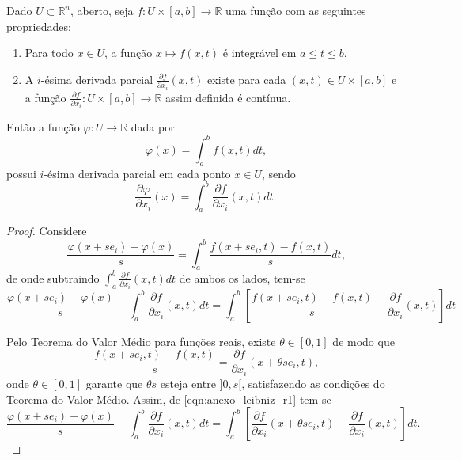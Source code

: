 \begin{apendicesenv}
{	\begin{teorema}
		\label{teorema:regra_de_leibniz}
		Dado $U\subset \mathbb{R}^n$, aberto, seja $f:U\times[a,b]\longrightarrow \mathbb{R}$ uma função com as seguintes propriedades:
		\begin{enumerate}
			\item Para todo $x \in U$, a função $x \longmapsto f(x,t)$ é integrável em $a \leqslant t \leqslant b$.
			\item A $i$-ésima derivada parcial $\frac{\partial f}{\partial x_i}(x,t)$ existe para cada $(x,t)\in U\times [a,b]$ e a função $\frac{\partial f}{\partial x_i}:U\times [a,b]\longrightarrow \mathbb{R}$ assim definida é contínua.
		\end{enumerate}
		Então a função $\varphi: U\longrightarrow \mathbb{R}$ dada por
		$$\varphi(x)=\int_a^b f(x,t)dt\text{,}$$
		possui $i$-ésima derivada parcial em cada ponto $x\in U$, sendo
		$$\frac{\partial \varphi}{\partial x_i}(x)=\int_a^b \frac{\partial f}{\partial x_i}(x,t)dt\text{.}$$

		\begin{proof}
			Considere
			$$
			\frac{\varphi(x+se_i)-\varphi(x)}{s}
			=
			\int_a^b \frac{f(x+se_i, t)-f(x,t)}{s} dt\text{,}
			$$
			de onde subtraindo $\int_a^b \frac{\partial f}{\partial x_i}(x,t) dt$ de ambos os lados, tem-se
			\begin{equation}
			\label{eqn:anexo_leibniz_r1}
			\frac{\varphi(x+se_i)-\varphi(x)}{s}
			- \int_a^b \frac{\partial f}{\partial x_i}(x,t) dt
			=
			\int_a^b \left [ 
				\frac{f(x+se_i, t)-f(x,t)}{s} 
				- \frac{\partial f}{\partial x_i}(x,t)
			\right ] dt
			\end{equation}
			
			Pelo Teorema do Valor Médio para funções reais, existe $\theta \in [0,1]$ de modo que
			$$
				\frac{f(x+se_i,t)-f(x,t)}{s}=\frac{\partial f}{\partial x_i}(x+\theta s e_i,t)\text{,}
			$$
			onde $\theta \in [0,1]$ garante que $\theta s$ esteja entre $]0, s[$, satisfazendo as condições do Teorema do Valor Médio. Assim, de \eqref{eqn:anexo_leibniz_r1} tem-se
			\begin{equation}
				\label{eqn:anexo_leibniz_voltas}
				\frac{\varphi(x+se_i)-\varphi(x)}{s}
				- \int_a^b \frac{\partial f}{\partial x_i}(x,t) dt
				=
				\int_a^b \left [
					\frac{\partial f}{\partial x_i}(x+\theta s e_i, t)-\frac{\partial f}{\partial x_i}(x,t)
				\right ] dt\text{.}
			\end{equation}
			

\end{proof}
\end{teorema}}
\end{apendicesenv}
